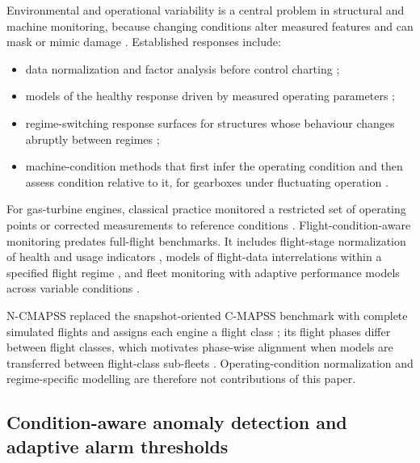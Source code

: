\documentclass[preprint,11pt,a4paper]{elsarticle}
\begin{document}
Environmental and operational variability is a central problem in structural and machine monitoring, because changing conditions alter measured features and can mask or mimic damage \cite{N2}. Established responses include:
\begin{itemize}
\item data normalization and factor analysis before control charting \cite{N2,N5};
\item models of the healthy response driven by measured operating parameters \cite{N4};
\item regime-switching response surfaces for structures whose behaviour changes abruptly between regimes \cite{N6};
\item machine-condition methods that first infer the operating condition and then assess condition relative to it, for gearboxes under fluctuating operation \cite{N3}.
\end{itemize}

For gas-turbine engines, classical practice monitored a restricted set of operating points or corrected measurements to reference conditions \cite{N35}. Flight-condition-aware monitoring predates full-flight benchmarks. It includes flight-stage normalization of health and usage indicators \cite{ref4}, models of flight-data interrelations within a specified flight regime \cite{ref3}, and fleet monitoring with adaptive performance models across variable conditions \cite{ref5}.

N-CMAPSS replaced the snapshot-oriented C-MAPSS benchmark with complete simulated flights and assigns each engine a flight class \cite{ref1}; its flight phases differ between flight classes, which motivates phase-wise alignment when models are transferred between flight-class sub-fleets \cite{N28}. Operating-condition normalization and regime-specific modelling are therefore not contributions of this paper.

\subsection{Condition-aware anomaly detection and adaptive alarm thresholds}
\end{document}
